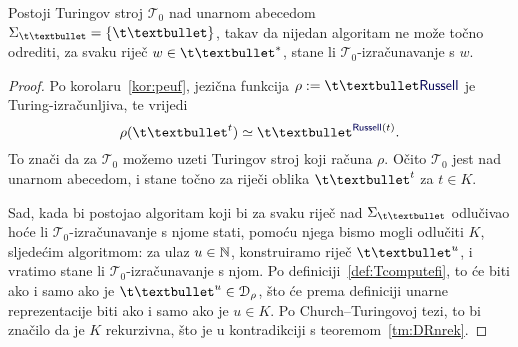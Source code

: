 \begin{lema}[{name=[neodlučivost problema zaustavljanja za jedan fiksni Turingov stroj]}]\label{lm:THaltnodl}
Postoji Turingov stroj $\mathcal T_0$ nad unarnom abecedom $\Sigma_{\t\textbullet}=\{\t\textbullet\}$, takav da nijedan algoritam ne može točno odrediti, za svaku riječ $w\in\t\textbullet^*$\!, stane li $\mathcal T_0$-izračunavanje s $w$.
\end{lema}
\begin{proof}
Po korolaru~\ref{kor:peuf}, jezična funkcija $\rho:=\t\textbullet\f{Russell}$ je Turing-izračunljiva, te vrijedi
\begin{equation}\label{eq:rhoRussell}
    \rho(\t\textbullet^t)\simeq\t\textbullet^{\f{Russell}(t)}\text.
\end{equation}
To znači da za $\mathcal T_0$ možemo uzeti Turingov stroj koji računa $\rho$. Očito $\mathcal T_0$ jest nad unarnom abecedom, i stane točno za riječi oblika $\t\textbullet^t$ za $t\in K$.

Sad, kada bi postojao algoritam koji bi za svaku riječ nad $\Sigma_{\t\textbullet}$ odlučivao hoće li $\mathcal T_0$-izračunavanje s njome stati, pomoću njega bismo mogli odlučiti $K$, sljedećim algoritmom: za ulaz $u\in{\mathbb N}$, konstruiramo riječ $\t\textbullet^u$, i vratimo stane li $\mathcal T_0$-izračunavanje s njom. Po definiciji~\ref{def:Tcomputefi}, to će biti ako i samo ako je $\t\textbullet^u\in\dom\rho$, što će prema definiciji unarne reprezentacije biti ako i samo ako je $u\in K$. Po Church--\!Turingovoj tezi, to bi značilo da je $K$ rekurzivna, što je u kontradikciji s teoremom~\ref{tm:DRnrek}.
\end{proof}

